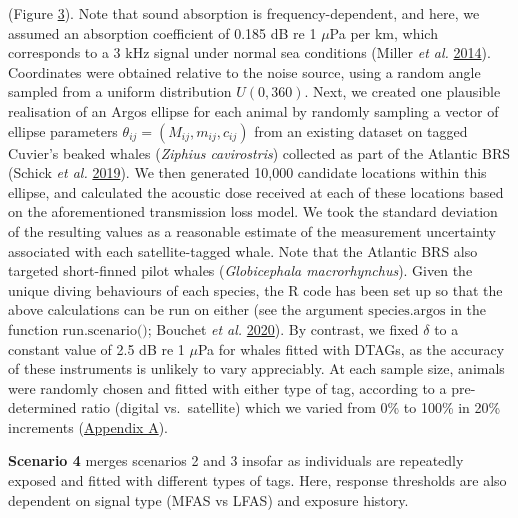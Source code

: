 \documentclass[
]{article}
\begin{document}
(Figure \hyperlink{fig3}{3}). Note that sound absorption is frequency-dependent, and here, we assumed an absorption coefficient of 0.185 dB re 1 \(\mu\)Pa per km, which corresponds to a 3 kHz signal under normal sea conditions (Miller \emph{et al.} \protect\hyperlink{ref-Miller2014}{2014}). Coordinates were obtained relative to the noise source, using a random angle sampled from a uniform distribution \(U(0, 360)\). Next, we created one plausible realisation of an Argos ellipse for each animal by randomly sampling a vector of ellipse parameters \(\theta_{ij} = (M_{ij}, m_{ij}, c_{ij})\) from an existing dataset on tagged Cuvier's beaked whales (\emph{Ziphius cavirostris}) collected as part of the Atlantic BRS (Schick \emph{et al.} \protect\hyperlink{ref-Schick2019}{2019}). We then generated 10,000 candidate locations within this ellipse, and calculated the acoustic dose received at each of these locations based on the aforementioned transmission loss model. We took the standard deviation of the resulting values as a reasonable estimate of the measurement uncertainty associated with each satellite-tagged whale. Note that the Atlantic BRS also targeted short-finned pilot whales (\emph{Globicephala macrorhynchus}). Given the unique diving behaviours of each species, the R code has been set up so that the above calculations can be run on either (see the argument \(\text{species.argos}\) in the function \(\text{run.scenario()}\); Bouchet \emph{et al.} \protect\hyperlink{ref-Bouchet2020b}{2020}). By contrast, we fixed \(\delta\) to a constant value of 2.5 dB re 1 \(\mu\)Pa for whales fitted with DTAGs, as the accuracy of these instruments is unlikely to vary appreciably. At each sample size, animals were randomly chosen and fitted with either type of tag, according to a pre-determined ratio (digital vs.~satellite) which we varied from 0\% to 100\% in 20\% increments (\hyperlink{appendixa}{Appendix A}).

\textbf{Scenario 4} merges scenarios 2 and 3 insofar as individuals are repeatedly exposed and fitted with different types of tags. Here, response thresholds are also dependent on signal type (MFAS vs LFAS) and exposure history.
\end{document}
